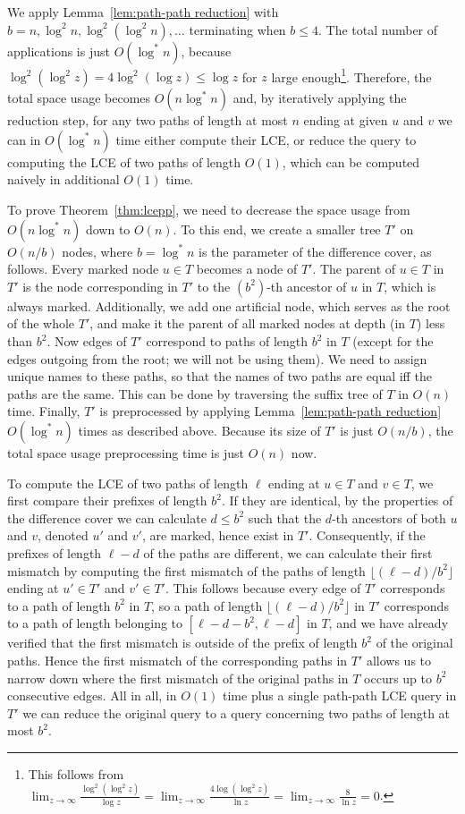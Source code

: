 \documentclass [10pt]{article}
\begin{document}
We apply Lemma~\ref{lem:path-path reduction} with $b=n,\log^{2}n,\log^{2}(\log^{2}n),\ldots$ terminating when $b\leq 4$.
The total number of applications is just $O(\log^{*}n)$,
because $\log^{2}(\log^{2}z)=4\log^{2}(\log z)\leq \log z$ for $z$ large enough\footnote{This follows from
$\lim_{z\to \infty}\frac{\log^{2}(\log^{2}z)}{\log z}=\lim_{z\to \infty} \frac{4\log(\log^{2}z)}{\ln z}=\lim_{z\to \infty} \frac{8}{\ln z}=0$.}. Therefore, the total space usage becomes $O(n\log^{*}n)$ and, by iteratively applying the reduction step,
for any two paths of length at most $n$ ending at given $u$ and $v$ we can in $O(\log^{*}n)$ time either compute their LCE,
or reduce the query to computing the LCE of two paths of length $O(1)$, which can be computed naively in additional
$O(1)$ time.

To prove Theorem~\ref{thm:lcepp}, we need to decrease the space usage from $O(n\log^{*}n)$ down to $O(n)$.
To this end, we create a smaller tree $T'$ on $O(n/b)$ nodes, where $b=\log^{*}n$ is the parameter of the difference cover, as follows. 
Every marked node $u\in T$ becomes a node of $T'$. The parent of $u\in T$ in $T'$ is the node corresponding in $T'$ to the $(b^{2})$-th ancestor
of $u$ in $T$, which is always marked. Additionally, we add one artificial node, which serves as the root of the whole $T'$, and make it the parent
of all marked nodes at depth (in $T$) less than $b^{2}$. Now edges of $T'$ correspond to paths of length $b^{2}$ in $T$ (except for the
edges outgoing from the root; we will not be using them). We need to assign unique names to these paths, so that the
names of two paths are equal iff the paths are the same. This can be done by traversing the suffix tree of $T$ in $O(n)$ time.
Finally, $T'$ is preprocessed by applying Lemma~\ref{lem:path-path reduction} $O(\log^{*}n)$ times as described above. Because
its size of $T'$ is just $O(n/b)$, the total space usage preprocessing time is just $O(n)$ now.

To compute the LCE of two paths of length $\ell$ ending at $u\in T$ and $v\in T$, we first compare their
prefixes of length $b^{2}$. If they are identical, by the properties of the difference cover we can calculate $d\leq b^{2}$ such that
the $d$-th ancestors of both $u$ and $v$, denoted $u'$ and $v'$, are marked, hence exist in $T'$. Consequently, if the prefixes of length
$\ell-d$ of the paths are different, we can calculate their first mismatch by computing the first mismatch of the paths of length
$\lfloor (\ell-d)/b^{2} \rfloor$ ending at $u'\in T'$ and $v'\in T'$. This follows because every edge of $T'$ corresponds to a path of length
$b^{2}$ in $T$, so a path of length $\lfloor (\ell-d)/b^{2} \rfloor$ in $T'$ corresponds to a path of length belonging to $[\ell-d-b^{2},\ell-d]$
in $T$, and we have already verified that the first mismatch is outside of the prefix of length $b^{2}$ of the original paths.
Hence the first mismatch of the corresponding paths in $T'$ allows us to narrow down where the first mismatch of the original paths in $T$
occurs up to $b^{2}$ consecutive edges.
All in all, in $O(1)$ time plus a single path-path LCE query in $T'$ we can reduce the original query to a query concerning
two paths of length at most $b^{2}$.
\end{document}
